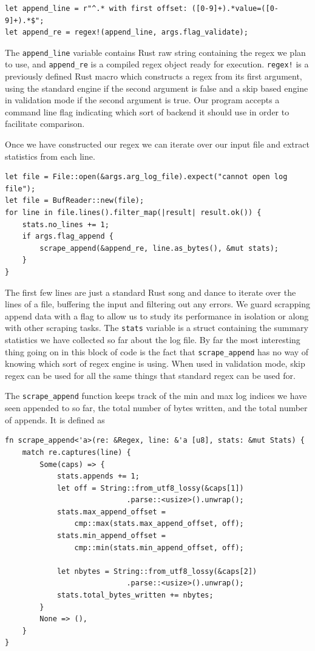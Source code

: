 \begin{verbatim}
let append_line = r"^.* with first offset: ([0-9]+).*value=([0-9]+).*$";
let append_re = regex!(append_line, args.flag_validate);
\end{verbatim}

\noindent
The \verb'append_line' variable contains Rust raw string containing the regex we
plan to use, and \verb'append_re' is a compiled regex object ready for
execution. \verb'regex!' is a previously defined Rust macro which
constructs a regex from its first argument, using the standard engine
if the second argument is false and a skip based engine in validation
mode if the second argument is true. Our program accepts a command
line flag indicating which sort of backend it should use in order
to facilitate comparison.

Once we have constructed our regex we can iterate over our input
file and extract statistics from each line.

\begin{verbatim}
let file = File::open(&args.arg_log_file).expect("cannot open log file");
let file = BufReader::new(file);
for line in file.lines().filter_map(|result| result.ok()) {
    stats.no_lines += 1;
    if args.flag_append {
        scrape_append(&append_re, line.as_bytes(), &mut stats);
    }
} 
\end{verbatim}

The first few lines are just a standard Rust song and dance to
iterate over the lines of a file, buffering the input and filtering
out any errors. We guard scrapping append data with a flag to allow
us to study its performance in isolation or along with other
scraping tasks. The \verb'stats' variable is a struct containing the summary
statistics we have collected so far about the log file. By far
the most interesting thing going on in this block of code is
the fact that \verb'scrape_append' has no way of knowing which
sort of regex engine is using. When used in validation mode,
skip regex can be used for all the same things that standard
regex can be used for.

The \verb'scrape_append' function keeps track of the min and max log
indices we have seen appended to so far, the total
number of bytes written, and the total number of appends.
It is defined as

\begin{verbatim}
fn scrape_append<'a>(re: &Regex, line: &'a [u8], stats: &mut Stats) {
    match re.captures(line) {
        Some(caps) => {
            stats.appends += 1;
            let off = String::from_utf8_lossy(&caps[1])
                            .parse::<usize>().unwrap();
            stats.max_append_offset =
                cmp::max(stats.max_append_offset, off);
            stats.min_append_offset =
                cmp::min(stats.min_append_offset, off);

            let nbytes = String::from_utf8_lossy(&caps[2])
                            .parse::<usize>().unwrap();
            stats.total_bytes_written += nbytes;
        }
        None => (),
    }
}
\end{verbatim}

